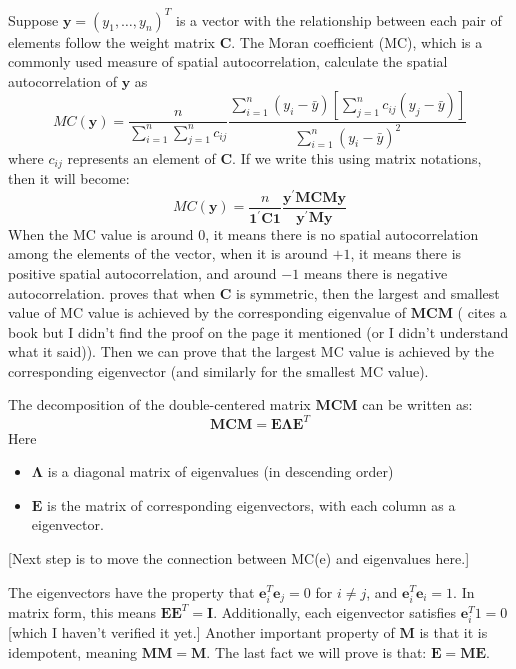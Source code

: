\documentclass[12pt]{article}
\begin{document}
Suppose \( \mathbf{y}=\left(y_1, \ldots, y_n\right)^T \) is a vector with the relationship between each pair of elements follow the weight matrix \( \mathbf{C} \). The Moran coefficient (MC), which is a commonly used measure of spatial autocorrelation, calculate the spatial autocorrelation of \( \mathbf{y} \) as \cite{Griffith_Chun_2014}
\[
  M C(\mathbf{y})=\frac{n}{\sum_{i=1}^n \sum_{j=1}^n c_{i j}} \frac{\sum_{i=1}^n\left(y_i-\bar{y}\right)\left[\sum_{j=1}^n c_{i j}\left(y_j-\bar{y}\right)\right]}{\sum_{i=1}^n\left(y_i-\bar{y}\right)^2}
\]
where \( c_{ij} \) represents an element of \( \mathbf{C} \). If we write this using matrix notations, then it will become:
\[
  M C(\mathbf{y})=\frac{n}{\mathbf{1}^{\prime} \mathbf{C} \mathbf{1}} \frac{\mathbf{y}^{\prime} \mathbf{M C M y}}{\mathbf{y}^{\prime} \mathbf{My}}
\]
When the MC value is around 0, it means there is no spatial autocorrelation among the elements of the vector, when it is around \( +1 \), it means there is positive spatial autocorrelation, and around \( -1 \) means there is negative autocorrelation. \cite{de1984extreme} proves that when \( \mathbf{C} \) is symmetric, then the largest and smallest value of MC value is achieved by the corresponding eigenvalue of \( \mathbf{MCM} \) (\cite{de1984extreme} cites a book \cite{bellman1997introduction} but I didn't find the proof on the page it mentioned (or I didn't understand what it said)). Then we can prove that the largest MC value is achieved by the corresponding eigenvector (and similarly for the smallest MC value).

The decomposition of the double-centered matrix \( \mathbf{M C M} \) can be written as:
\[
  \mathbf{M C M}=\mathbf{E} \boldsymbol{\Lambda} \mathbf{E}^{T}
\]
Here
\begin{itemize}
  \item \( \boldsymbol{\Lambda} \) is a diagonal matrix of eigenvalues (in descending order)
  \item \( \mathbf{E} \) is the matrix of corresponding eigenvectors, with each column as a eigenvector.
\end{itemize}

[Next step is to move the connection between MC(e) and eigenvalues here.]

The eigenvectors have the property that \( \mathbf{e}_i^T \mathbf{e}_j=0 \) for \( i \neq j \), and \( \mathbf{e}_i^T \mathbf{e}_i=1 \). In matrix form, this means \( \mathbf{E E}^T=\mathbf{I} \). Additionally, each eigenvector satisfies \( \mathbf{e}_i^T 1 = 0 \) [which I haven't verified it yet.] Another important property of \(\mathbf{M}\) is that it is idempotent, meaning \(\mathbf{M M}=\mathbf{M}\). The last fact we will prove is that: \( \mathbf{E}=\mathbf{M E} \).
\end{document}
